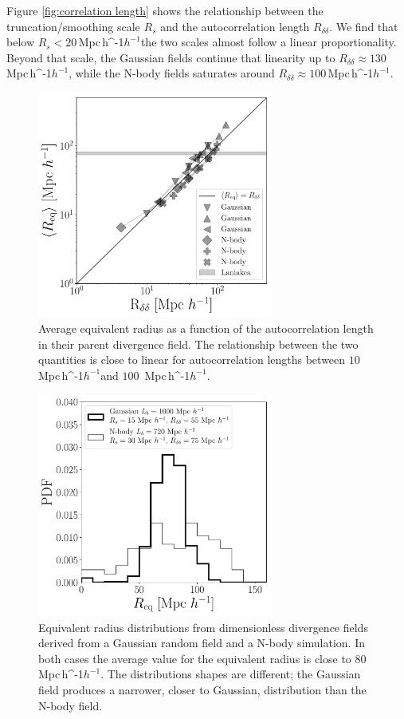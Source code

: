 \documentclass[usenatbib]{mnras}
\newcommand{\Mpch}{\,{\rm Mpc}\,\ifmmode h^{-1}\else $h^{-1}$\fi}
\begin{document}
Figure \ref{fig:correlation length} shows the relationship between the truncation/smoothing scale $R_s$ and the autocorrelation length $R_{\delta\delta}$.
We find that below $R_{s} < 20$\Mpch the two scales almost follow a linear proportionality.
Beyond that scale, the Gaussian fields continue that linearity up to $R_{\delta\delta}\approx 130$\Mpch, while the N-body fields saturates around $R_{\delta\delta}\approx 100$\Mpch.


\begin{figure}
    \centering
    \includegraphics[width=220pt]{summary_watershed.pdf}
    \caption{Average equivalent radius as a function of the autocorrelation length in their parent divergence field.
    The relationship between the two quantities is close to linear for autocorrelation lengths between $10$ \Mpch and $100$ \Mpch. \label{fig:money_plot}}
\end{figure}


 
\begin{figure}
    \centering
    \includegraphics[width=220pt]{sizes_histogram.pdf}
    \caption{Equivalent radius distributions from dimensionless divergence fields derived from a Gaussian random field and a N-body simulation.
    In both cases the average value for the equivalent radius is close to $80$\Mpch. 
    The distributions shapes are different; the Gaussian field produces a narrower, closer to Gaussian, distribution than the N-body field. }  
    \label{fig:Nclusters}
\end{figure}
\end{document}
